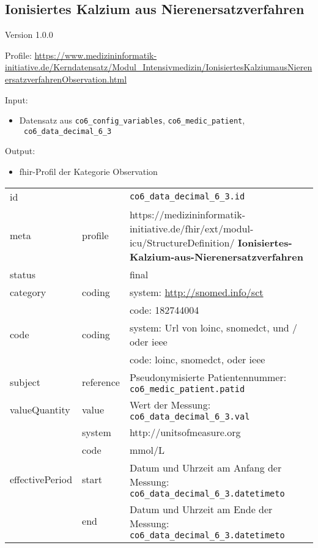 \subsection{Ionisiertes Kalzium aus Nierenersatzverfahren} 
\noindent Version 1.0.0

\noindent Profile: \url{https://www.medizininformatik-initiative.de/Kerndatensatz/Modul_Intensivmedizin/IonisiertesKalziumausNierenersatzverfahrenObservation.html}

\noindent Input:
\begin{itemize}
	\item Datensatz aus \texttt{co6\_config\_variables}, \texttt{co6\_medic\_patient}, \\ \texttt{
co6\_data\_decimal\_6\_3}
\end{itemize}
Output:
\begin{itemize}
        \item \ac{fhir}-Profil der Kategorie \glqq Observation\grqq{}
\end{itemize}
\begin{longtable}{|l|l|p{7.5cm}|}
        \hline
        \rowcolor{lightgray} \multicolumn{3}{|l|}{Data Mapping (inhaltlich)} \\ \hline
        id &  & \texttt{co6\_data\_decimal\_6\_3.id} \\ \hline
	meta & profile & https://medizininformatik-initiative.de/fhir/ext/modul-icu/StructureDefinition/\textbf{
Ionisiertes-Kalzium-aus-Nierenersatzverfahren} \\ \hline 
	status &  & final  \\ \hline 
	category & coding & system: \url{http://snomed.info/sct} \\
\cline{3-3}
	& & code: 182744004 \\ \hline
	code & coding & system: Url von \ac{loinc}, \ac{snomedct}, und / oder \ac{ieee} \\ 
	\cline{3-3} 
	 &  & code: \ac{loinc}, \ac{snomedct}, oder \ac{ieee} \\ \hline
	subject & reference & Pseudonymisierte Patientennummer: \texttt{co6\_medic\_patient.patid} \\ \hline
	valueQuantity & value & Wert der Messung: \texttt{
co6\_data\_decimal\_6\_3.val} \\
        \cline{2-3}
         & system & http://unitsofmeasure.org \\
         \cline{2-3}
         & code & mmol/L \\ \hline
    effectivePeriod & start & Datum und Uhrzeit am Anfang der Messung: \texttt{
co6\_data\_decimal\_6\_3.datetimeto} \\
    \cline{2-3}
     & end & Datum und Uhrzeit am Ende der Messung: \texttt{
co6\_data\_decimal\_6\_3.datetimeto} \\ \hline
\end{longtable}


